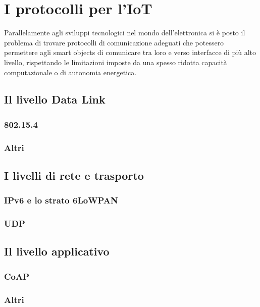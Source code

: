 \chapter{I protocolli per l'IoT}
Parallelamente agli sviluppi tecnologici nel mondo dell'elettronica si è posto il problema di trovare protocolli di comunicazione adeguati che potessero permettere agli smart objects di comunicare tra loro e verso interfacce di più alto livello, rispettando le limitazioni imposte da una spesso ridotta capacità computazionale o di autonomia energetica.


\section{Il livello Data Link}

\subsection{802.15.4}
\subsection{Altri}

\section{I livelli di rete e trasporto}

\subsection{IPv6 e lo strato 6LoWPAN}
\subsection{UDP}


\section{Il livello applicativo}

\subsection{CoAP}
\subsection{Altri}
